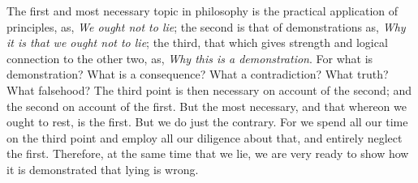 The first and  most necessary topic in philosophy is  the practical application
of  principles,  as,  \emph{We  ought  not  to lie};  the  second  is  that  of
demonstrations as, \emph{Why it  is that we ought not to  lie}; the third, that
which gives  strength and logical  connection to  the other two,  as, \emph{Why
this is  a demonstration}. For  what is  demonstration? What is  a consequence?
What  a contradiction?  What truth?  What falsehood?  The third  point is  then
necessary on account of the second; and the second on account of the first. But
the most necessary, and that whereon we ought  to rest, is the first. But we do
just the contrary. For we spend all our  time on the third point and employ all
our diligence  about that, and  entirely neglect  the first. Therefore,  at the
same time that  we lie, we are very  ready to show how it  is demonstrated that
lying is wrong.
